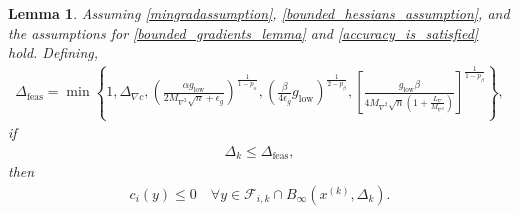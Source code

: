 \documentclass{article}
\newtheorem{lemma}[theorem]{Lemma}
\theoremstyle{case}
\newcommand{\dfeas}{{\Delta_{\text{feas}}}}
\newcommand{\dk}{\Delta_k}
\newcommand{\fik}{{\mathcal F_{i, k}}}
\newcommand{\lipgrad}{{L_{\nabla}}}
\newcommand{\maxhessian}{{M_{\nabla^2}}}
\newcommand{\mingraddelta}{{\Delta_{\nabla c}}}
\newcommand{\mingrad}{{ g_{\text{low}} }}
\newcommand{\tr}{{ B_{\infty}\left(\xk, \dk\right) }}
\newcommand{\xk}{{x^{(k)}}}
\begin{document}
\begin{lemma}
\label{each_constraints_cone_is_feasible}
Assuming \cref{mingradassumption}, \cref{bounded_hessians_assumption}, and the assumptions for \cref{bounded_gradients_lemma} and \cref{accuracy_is_satisfied} hold.
Defining,
\begin{align}
\dfeas = \min\left\{
1,
\mingraddelta,
\left(\frac{\alpha \mingrad}{2 \maxhessian \sqrt{n} + \epsilon_g}\right)^{\frac 1 {1-p_{\alpha}}},
\left(\frac{\beta}{4\epsilon_{g}}\mingrad\right)^{\frac 1 {2 - p_{\beta}}},
\left[\frac {\mingrad  \beta} {4\maxhessian\sqrt{n}\left(1 + \frac {\lipgrad} \maxhessian \right)}\right]^{\frac1 {1 - p_{\beta}} }
\right\}, \label{define_delta_feasible}
\end{align}
if
\begin{align}
\dk \le \dfeas, \label{delta_is_small_enough}
\end{align} then
\begin{align*}
c_i(y) \le 0 \quad \forall y \in \fik \cap \tr.
\end{align*}
\end{lemma}
\end{document}

